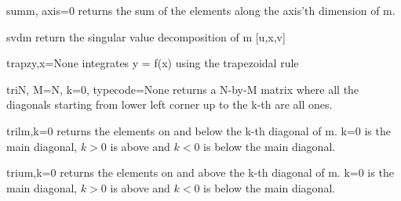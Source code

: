 \newpage
\begin{funcdesc}{sum}{m, axis=0}
   \label{cha:mlab:sum}
   \label{func:sum}
   returns the sum of the elements along the axis'th dimension of m.
\end{funcdesc}
\begin{funcdesc}{svd}{m}
   \label{cha:mlab:svd}
   \label{func:svd}
   return the singular value decomposition of m [u,x,v]
\end{funcdesc}
\begin{funcdesc}{trapz}{y,x=None}
   \label{cha:mlab:trapz}
   \label{func:trapz}
   integrates y = f(x) using the trapezoidal rule
\end{funcdesc}
\begin{funcdesc}{tri}{N, M=N, k=0, typecode=None}
   \label{cha:mlab:tri}
   \label{func:tri}
   returns a N-by-M matrix where all the diagonals starting from lower left corner up to the k-th are all ones.
\end{funcdesc}
\begin{funcdesc}{tril}{m,k=0}
   \label{cha:mlab:tril}
   \label{func:tril}
   returns the elements on and below the k-th diagonal of m. k=0 is the main
   diagonal, \begin{math} k > 0\end{math} is above and \begin{math}k < 0
   \end{math} is below the main diagonal.
\end{funcdesc}

\begin{funcdesc}{triu}{m,k=0}
   \label{sec:mlab-functions:triu}
   \label{func:triu}
   returns the elements on and above the k-th diagonal of m. k=0 is the main
   diagonal, \begin{math}k > 0\end{math} is above and \begin{math}k <
   0\end{math} is below the main diagonal.
\end{funcdesc}

